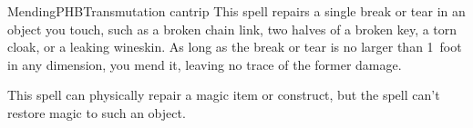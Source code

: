 \begin{spell}{Mending}{PHB}{Transmutation cantrip}
{
}
This spell repairs a single break or tear in an object you
touch, such as a broken chain link, two halves of a broken
key, a torn cloak, or a leaking wineskin. As long as the
break or tear is no larger than 1~foot in any dimension,
you mend it, leaving no trace of the former damage.

This spell can physically repair a magic item or construct,
but the spell can't restore magic to such an object.
\end{spell}
